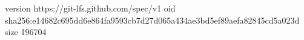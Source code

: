 version https://git-lfs.github.com/spec/v1
oid sha256:e14682c695dd6e864fa9593cb7d27d065a434ae3bd5ef89aefa82845cd5a023d
size 196704
